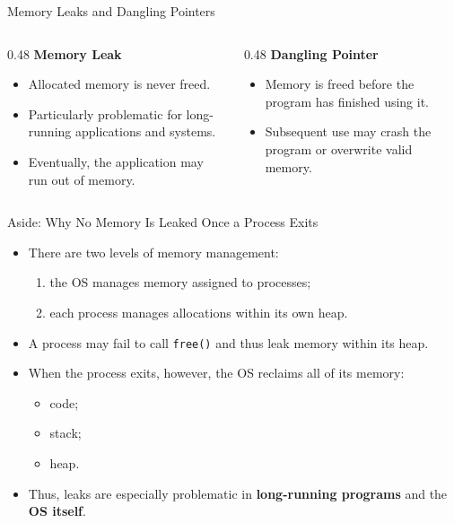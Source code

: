 \begin{frame}{Memory Leaks and Dangling Pointers}
    \begin{columns}
        \begin{column}{0.48\textwidth}
            \textbf{Memory Leak}
            \begin{itemize}
                \item Allocated memory is never freed.
                \item Particularly problematic for long-running
                      applications and systems.
                \item Eventually, the application may run out
                      of memory.
            \end{itemize}
        \end{column}

        \begin{column}{0.48\textwidth}
            \textbf{Dangling Pointer}
            \begin{itemize}
                \item Memory is freed before the program
                      has finished using it.
                \item Subsequent use may crash the program
                      or overwrite valid memory.
            \end{itemize}
        \end{column}
    \end{columns}
\end{frame}


\begin{frame}{Aside: Why No Memory Is Leaked Once a Process Exits}
    \begin{itemize}
        \item There are two levels of memory management:
        \begin{enumerate}
            \item the OS manages memory assigned to processes;
            \item each process manages allocations within its own heap.
        \end{enumerate}

        \item A process may fail to call \texttt{free()} and thus
              leak memory within its heap.

        \item When the process exits, however, the OS reclaims
              all of its memory:
        \begin{itemize}
            \item code;
            \item stack;
            \item heap.
        \end{itemize}

        \item Thus, leaks are especially problematic in
              \textbf{long-running programs} and the \textbf{OS itself}.
    \end{itemize}
\end{frame}


